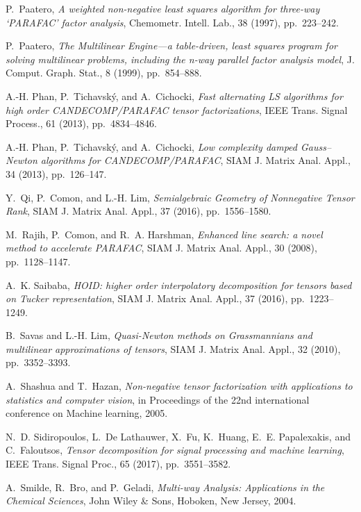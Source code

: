 \documentclass[a4paper,10pt,final]{siamart1116}
\numberwithin{equation}{section}
\numberwithin{figure}{section}
\numberwithin{table}{section}
\numberwithin{theorem}{section}
\begin{document}
\begin{thebibliography}{10}
{\sc P.~Paatero}, {\em A weighted non-negative least squares algorithm for
  three-way ‘{PARAFAC}’ factor analysis}, Chemometr. Intell. Lab., 38
  (1997), pp.~223--242.

{\sc P.~Paatero}, {\em {The Multilinear Engine}---a table-driven, least squares
  program for solving multilinear problems, including the n-way parallel factor
  analysis model}, J. Comput. Graph. Stat., 8 (1999), pp.~854--888.

{\sc A.-H. Phan, P.~Tichavsk\'y, and A.~Cichocki}, {\em Fast alternating {LS}
  algorithms for high order {CANDECOMP}/{PARAFAC} tensor factorizations}, IEEE
  Trans. Signal Process., 61 (2013), pp.~4834--4846.

{\sc A.-H. Phan, P.~Tichavsk\'y, and A.~Cichocki}, {\em Low complexity damped
  {Gauss}--{Newton} algorithms for {CANDECOMP}/{PARAFAC}}, SIAM J. Matrix Anal.
  Appl., 34 (2013), pp.~126--147.

{\sc Y.~{Qi}, P.~{Comon}, and L.-H. {Lim}}, {\em {Semialgebraic Geometry of
  Nonnegative Tensor Rank}}, SIAM J. Matrix Anal. Appl., 37 (2016),
  pp.~1556--1580.

{\sc M.~Rajih, P.~Comon, and R.~A. Harshman}, {\em Enhanced line search: a
  novel method to accelerate {PARAFAC}}, SIAM J. Matrix Anal. Appl., 30 (2008),
  pp.~1128--1147.

{\sc A.~K. Saibaba}, {\em {HOID:} higher order interpolatory decomposition for
  tensors based on {Tucker} representation}, SIAM J. Matrix Anal. Appl., 37
  (2016), pp.~1223--1249.

{\sc B.~Savas and L.-H. Lim}, {\em Quasi-{N}ewton methods on {G}rassmannians
  and multilinear approximations of tensors}, SIAM J. Matrix Anal. Appl., 32
  (2010), pp.~3352--3393.

{\sc A.~Shashua and T.~Hazan}, {\em Non-negative tensor factorization with
  applications to statistics and computer vision}, in Proceedings of the 22nd
  international conference on Machine learning, 2005.

{\sc N.~D. Sidiropoulos, L.~{De Lathauwer}, X.~Fu, K.~Huang, E.~E. Papalexakis,
  and C.~Faloutsos}, {\em Tensor decomposition for signal processing and
  machine learning}, IEEE Trans. Signal Proc., 65 (2017), pp.~3551--3582.

{\sc A.~Smilde, R.~Bro, and P.~Geladi}, {\em {Multi-way Analysis: Applications
  in the Chemical Sciences}}, John Wiley \& Sons, Hoboken, New Jersey, 2004.


\end{thebibliography}
\end{document}
